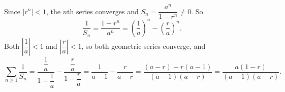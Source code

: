 Since $|r^n|<1$, the $n$th series converges and $S_n=\dfrac{a^n}{1-r^n}\ne0$. So
\[\dfrac1{S_n}=\dfrac{1-r^n}{a^n}=\left(\dfrac1a\right)^n-\left(\dfrac ra\right)^n.\]
Both $\left|\dfrac1a\right|<1$ and $\left|\dfrac ra\right|<1$, so both geometric series converge, and
\[\sum_{n\ge1}\dfrac1{S_n}=\dfrac{\dfrac1a}{1-\dfrac1a}-\dfrac{\dfrac ra}{1-\dfrac ra}=\dfrac1{a-1}-\dfrac r{a-r}=\dfrac{(a-r)-r(a-1)}{(a-1)(a-r)}=\boxed{\dfrac{a(1-r)}{(a-1)(a-r)}}.\]
